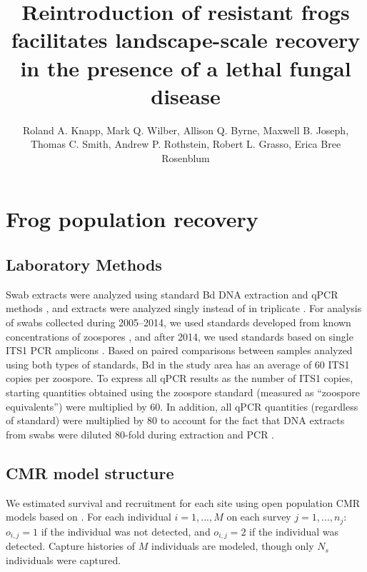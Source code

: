 \documentclass[9pt,twoside,lineno]{pnas-new}
\title{Reintroduction of resistant frogs facilitates landscape-scale recovery in the presence of a lethal fungal disease}
\author{Roland A. Knapp, Mark Q. Wilber, Allison Q. Byrne, Maxwell B. Joseph, Thomas C. Smith, Andrew P. Rothstein, Robert L. Grasso, Erica Bree Rosenblum}
\begin{document}
\maketitle

\SItext
\hypertarget{frog-population-recovery-2}{%
\section{Frog population
recovery}\label{frog-population-recovery-2}}

\hypertarget{laboratory-methods}{%
\subsection{Laboratory Methods}\label{laboratory-methods}}

Swab extracts were analyzed using standard Bd DNA extraction and qPCR
methods \citep{boyle2004}, and extracts were analyzed singly instead of
in triplicate \citep{kriger2006}. For analysis of swabs collected during
2005--2014, we used standards developed from known concentrations of
zoospores \citep{boyle2004}, and after 2014, we used standards based on
single ITS1 PCR amplicons \citep{longo2013}. Based on paired comparisons
between samples analyzed using both types of standards, Bd in the study
area has an average of 60 ITS1 copies per zoospore. To express all qPCR
results as the number of ITS1 copies, starting quantities obtained using
the zoospore standard (measured as ``zoospore equivalents'') were
multiplied by 60. In addition, all qPCR quantities (regardless of
standard) were multiplied by 80 to account for the fact that DNA
extracts from swabs were diluted 80-fold during extraction and PCR
\citep{vredenburg2010}.

\hypertarget{cmr-model-structure}{%
\subsection{CMR model structure}\label{cmr-model-structure}}

We estimated survival and recruitment for each site using open
population CMR models based on \citep{joseph2018}. For each individual
\(i=1, ..., M\) on each survey \(j=1, ..., n_j\): \(o_{i, j} = 1\) if
the individual was not detected, and \(o_{i, j}=2\) if the individual
was detected. Capture histories of \(M\) individuals are modeled, though
only \(N_s\) individuals were captured.
\end{document}
